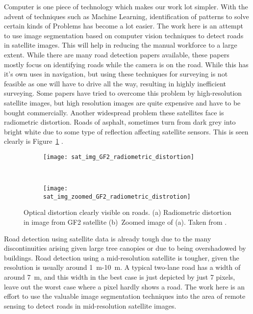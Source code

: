 Computer is one piece of technology which makes our work lot simpler. With the advent of techniques such as Machine Learning, identification of patterns to solve certain kinds of Problems has become a lot easier. The work here is an attempt to use image segmentation based on computer vision techniques to detect roads in satellite images. This will help in reducing the manual workforce to a large extent. While there are many road detection papers available, these papers mostly focus on identifying roads while the camera is on the road. While this has it's own uses in navigation, but using these techniques for surveying is not feasible as one will have to drive all the way, resulting in highly inefficient surveying. Some papers have tried to overcome this problem by high-resolution satellite images, but high resolution images are quite expensive and have to be bought commercially. Another widespread problem these satellites face is radiometric distortion. Roads of asphalt, sometimes turn from dark grey into bright white due to some type of reflection affecting satellite sensors. This is seen clearly is Figure~\ref{fig:sat_img_radiometric_distortion} \cite{GF2-imageCaseStudy}. \par

\begin{figure}[t]
  \centering
  \begin{subfigure}{0.5\textwidth}
    \texttt{[image: sat\_img\_GF2\_radiometric\_distortion]}
    \caption{}
  \end{subfigure}~
  \begin{subfigure}{0.5\textwidth}
    \texttt{[image: sat\_img\_zoomed\_GF2\_radiometric\_distrotion]}
    \caption{}
  \end{subfigure}
  \caption[Optical distortion clearly visible on roads]{Optical distortion clearly visible on roads. (a) Radiometric distortion in image from GF2 satellite (b)~Zoomed image of (a). Taken from \cite{GF2-imageCaseStudy}.}%
  \label{fig:sat_img_radiometric_distortion}%
\end{figure}


Road detection using satellite data is already tough due to the many discontinuities arising given large tree canopies or due to being overshadowed by buildings. Road detection using a mid-resolution satellite is tougher, given the resolution is usually around 1~m-10~m. A typical two-lane road has a width of around 7~m, and this width in the best case is just depicted by just 7 pixels, leave out the worst case where a pixel hardly shows a road. The work here is an effort to use the valuable image segmentation techniques into the area of remote sensing to detect roads in mid-resolution satellite images.